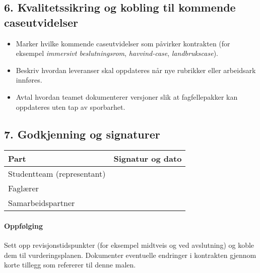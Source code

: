 \subsection*{6. Kvalitetssikring og kobling til kommende caseutvidelser}
\begin{itemize}
    \item Marker hvilke kommende caseutvidelser som påvirker kontrakten (for eksempel
    \emph{immersivt beslutningsrom}, \emph{havvind-case}, \emph{landbrukscase}).
    \item Beskriv hvordan leveranser skal oppdateres når nye rubrikker eller arbeidsark innføres.
    \item Avtal hvordan teamet dokumenterer versjoner slik at fagfellepakker kan oppdateres uten tap av sporbarhet.
\end{itemize}

\subsection*{7. Godkjenning og signaturer}
\begin{tabular}{p{}p{}}
\toprule
\textbf{Part} & \textbf{Signatur og dato} \\
\midrule
Studentteam (representant) & \\
Faglærer & \\
Samarbeidspartner & \\
\bottomrule
\end{tabular}

\paragraph{Oppfølging}
Sett opp revisjonstidspunkter (for eksempel midtveis og ved avslutning) og koble dem til vurderingsplanen.
Dokumenter eventuelle endringer i kontrakten gjennom korte tillegg som refererer til denne malen.
